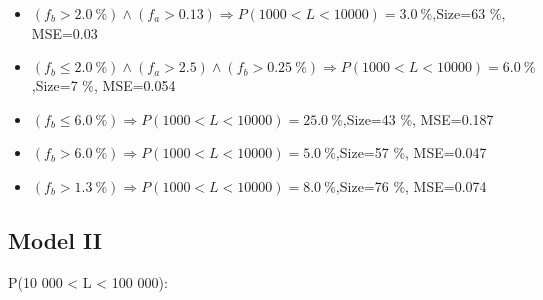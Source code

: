 \documentclass[numbered]{CSL}
\begin{document}
\begin{itemize}
\item $(f_b > 2.0~\%) \land (f_a > 0.13) \Rightarrow P(1 000 < L < 10 000) = 3.0~\%$,\hfill Size=63 \%, MSE=0.03
\item $(f_b \leq 2.0~\%) \land (f_a > 2.5) \land (f_b > 0.25~\%) \Rightarrow P(1 000 < L < 10 000) = 6.0~\%$,\hfill Size=7 \%, MSE=0.054
\item $(f_b \leq 6.0~\%) \Rightarrow P(1 000 < L < 10 000) = 25.0~\%$,\hfill Size=43 \%, MSE=0.187
\item $(f_b > 6.0~\%) \Rightarrow P(1 000 < L < 10 000) = 5.0~\%$,\hfill Size=57 \%, MSE=0.047
\item $(f_b > 1.3~\%) \Rightarrow P(1 000 < L < 10 000) = 8.0~\%$,\hfill Size=76 \%, MSE=0.074
\end{itemize}

\subsection{Model II}
P(10 000 < L < 100 000):
\end{document}
